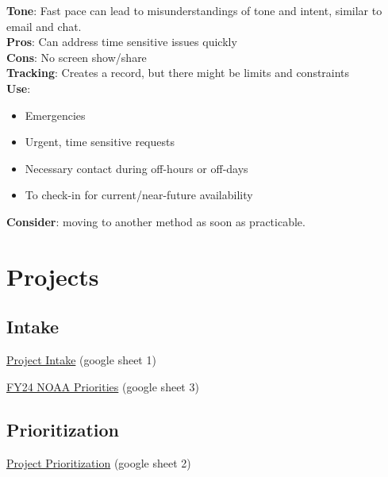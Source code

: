 \documentclass[
  letterpaper,
  DIV=11,
  numbers=noendperiod]{scrreprt}
\providecommand{\tightlist}{%
  \setlength{\itemsep}{0pt}\setlength{\parskip}{0pt}}\usepackage{longtable,booktabs,array}
\begin{document}
\textbf{Tone}: Fast pace can lead to misunderstandings of tone and
intent, similar to email and chat.\\
\textbf{Pros}: Can address time sensitive issues quickly\\
\textbf{Cons}: No screen show/share\\
\textbf{Tracking}: Creates a record, but there might be limits and
constraints\\
\textbf{Use}:

\begin{itemize}
\tightlist
\item
  Emergencies\\
\item
  Urgent, time sensitive requests\\
\item
  Necessary contact during off-hours or off-days\\
\item
  To check-in for current/near-future availability
\end{itemize}

\textbf{Consider}: moving to another method as soon as practicable.


\hypertarget{sec-projects}{%
\chapter{Projects}\label{sec-projects}}

\hypertarget{intake}{%
\section{Intake}\label{intake}}

\href{https://docs.google.com/spreadsheets/d/1MXWbgYy-91S_PvldipatwdodjIjBECVL5yuWkLVIw50/edit?usp=sharing}{Project
Intake} (google sheet 1)

\href{https://docs.google.com/spreadsheets/d/1MXWbgYy-91S_PvldipatwdodjIjBECVL5yuWkLVIw50/edit?usp=sharing}{FY24
NOAA Priorities} (google sheet 3)

\hypertarget{prioritization}{%
\section{Prioritization}\label{prioritization}}

\href{https://docs.google.com/spreadsheets/d/1MXWbgYy-91S_PvldipatwdodjIjBECVL5yuWkLVIw50/edit?usp=sharing}{Project
Prioritization} (google sheet 2)
\end{document}
